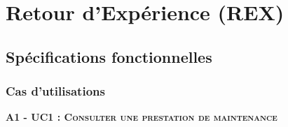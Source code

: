 \section{Retour d'Expérience (REX)} %

\subsection{Spécifications fonctionnelles}

\subsubsection{Cas d’utilisations}

\noindent\textsc{\bf{A1 - UC1 :} Consulter une prestation de maintenance}
